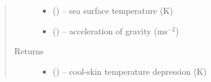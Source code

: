 \documentclass[letterpaper,10pt,english]{sphinxmanual}
\begin{document}
\begin{fulllineitems}
\begin{quote}
\begin{description}
\begin{itemize}
\item {} 
 (\href{https://docs.python.org/3/library/functions.html\#float}{}) -- sea surface temperature (K)

\item {} 
 (\href{https://docs.python.org/3/library/functions.html\#float}{}) -- acceleration of gravity (ms$^{-2}$)

\end{itemize}

\item[{Returns}] \leavevmode
\begin{itemize}
\item {} 
 (\href{https://docs.python.org/3/library/functions.html\#float}{}) -- cool-skin temperature depression (K)

\end{itemize}

\end{description}\end{quote}
\end{fulllineitems}

\end{document}
